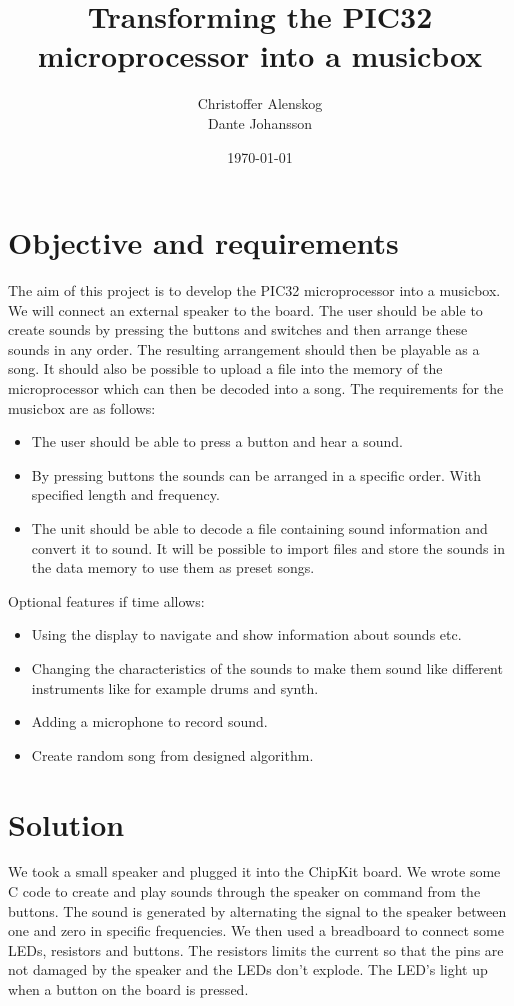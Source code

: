 \documentclass[a4paper]{article}
\title{Transforming the PIC32 microprocessor into a musicbox}
\author{Christoffer Alenskog \\ Dante Johansson }
\date{\today}
\begin{document}
\maketitle

\section{Objective and requirements}

The aim of this project is to develop the PIC32 microprocessor into a musicbox. We will connect an external speaker to the board. The user should be able to create sounds by pressing the buttons and switches and then arrange these sounds in any order. The resulting arrangement should then be playable as a song. It should also be possible to upload a file into the memory of the microprocessor which can then be decoded into a song. The requirements for the musicbox are as follows:
\begin{itemize}
	\item The user should be able to press a button and hear a sound.
	\item By pressing buttons the sounds can be arranged in a specific order. With specified length and frequency.
	\item The unit should be able to decode a file containing sound information and convert it to sound. It will be possible to import files and store the sounds in the data memory to use them as preset songs.
\end{itemize}
Optional features if time allows:
\begin{itemize}
	\item Using the display to navigate and show information about sounds etc.
	\item Changing the characteristics of the sounds to make them sound like different instruments like for example drums and synth.
	\item Adding a microphone to record sound.
	\item Create random song from designed algorithm.
\end{itemize}

\section{Solution}

We took a small speaker and plugged it into the ChipKit board. We wrote some C code to create and play sounds through the speaker on command from the buttons. The sound is generated by alternating the signal to the speaker between one and zero in specific frequencies. We then used a  breadboard to connect some LEDs, resistors and buttons. The resistors limits the current so that the pins are not damaged by the speaker and the LEDs don't explode. The LED's light up when a button on the board is pressed. \\
\end{document}

